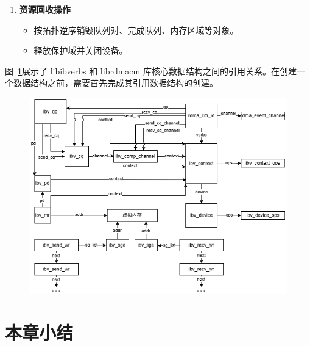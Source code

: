 {\begin{enumerate}[label=\textbf{步骤 \arabic*.}, leftmargin=0.5cm, align=left]
        \item \textbf{资源回收操作}
              \begin{itemize}
                  \item 按拓扑逆序销毁队列对、完成队列、内存区域等对象。
                  \item 释放保护域并关闭设备。
              \end{itemize}
    \end{enumerate}
    图~\ref{fig:RDMA-structs}展示了 libibverbs 和 librdmacm 库核心数据结构之间的引用关系。在创建一个数据结构之前，需要首先完成其引用数据结构的创建。
    \begin{figure}[!htbp]
        \centering
        \includegraphics[width=\linewidth]{Img/RDMA-structs.png}
        \label{fig:RDMA-structs}
    \end{figure}



    \section{本章小结}
}